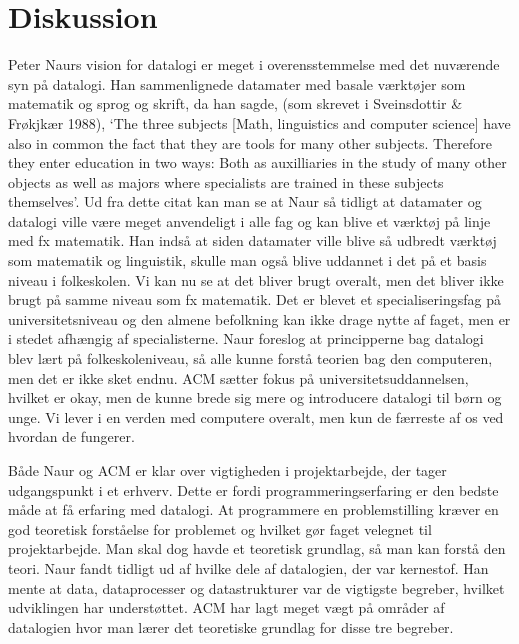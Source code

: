 \section{Diskussion}
Peter Naurs vision for datalogi er meget i overensstemmelse med det nuværende syn på datalogi.
Han sammenlignede datamater med basale værktøjer som matematik og 
sprog og skrift, da han sagde, (som skrevet i Sveinsdottir \& Frøkjkær 1988), 
`The three subjects [Math, linguistics and computer science] have also in 
common the fact that they are tools for many other subjects. Therefore 
they enter education in two ways: Both as auxilliaries in the study of many other objects as well 
as majors where specialists are trained in these subjects themselves'. 
Ud fra dette citat kan man se at Naur så tidligt at datamater og datalogi ville være meget anvendeligt 
i alle fag og kan blive et værktøj på 
linje med fx matematik. Han indså at siden datamater ville blive så udbredt 
værktøj som matematik og linguistik, skulle man også blive uddannet 
i det på et basis niveau i folkeskolen. Vi kan nu se at det bliver brugt overalt, men det bliver ikke brugt på 
samme niveau som fx matematik. Det er blevet et specialiseringsfag på universitetsniveau og den 
almene befolkning kan ikke drage nytte af faget, men er i stedet afhængig af specialisterne. Naur 
foreslog at principperne bag datalogi blev lært på folkeskoleniveau, så alle kunne forstå teorien 
bag den computeren, men det er ikke sket endnu. ACM sætter fokus på universitetsuddannelsen, 
hvilket er okay, men de kunne brede sig mere og introducere datalogi til børn og unge. Vi lever 
i en verden med computere overalt, men kun de færreste af os ved hvordan de fungerer.

Både Naur og ACM er klar over vigtigheden i projektarbejde, der tager udgangspunkt i et erhverv. 
Dette er fordi programmeringserfaring er den bedste måde at få erfaring med datalogi. At programmere 
en problemstilling kræver en god teoretisk forståelse for problemet og hvilket gør faget velegnet til 
projektarbejde. Man skal dog havde et teoretisk grundlag, så man kan forstå den teori. Naur fandt 
tidligt ud af hvilke dele af datalogien, der var kernestof. Han mente at data, dataprocesser og 
datastrukturer var de vigtigste begreber, hvilket udviklingen har understøttet. ACM har lagt meget 
vægt på områder af datalogien hvor man lærer det teoretiske grundlag for disse tre begreber.

